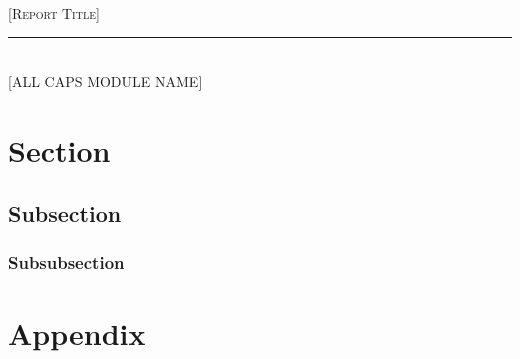 \documentclass[a4paper]{article}
\begin{document}
\begin{center}

\hfill\\
[1em]
{\huge {\color{RoyalBlue} \textsc{[Report Title]}}}\\
[0.25em]
\rule{\textwidth}{1pt}\\
[1em]
{\Large {\color{NavyBlue} [ALL CAPS MODULE NAME]}}\\
[0.25em]
\end{center}


\tableofcontents
\cleardoublepage

\section{Section}

\subsection{Subsection}

\subsubsection{Subsubsection}

\printbibliography

\cleardoublepage

\appendix
{}

\section{Appendix}
\end{document}
